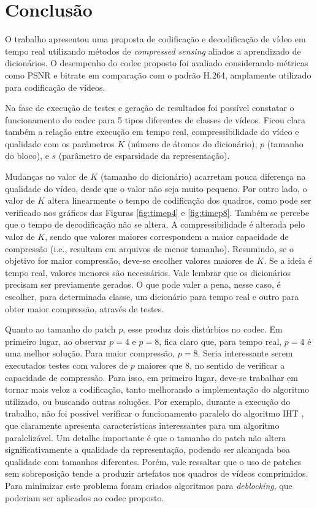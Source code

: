 \documentclass[cic,tc]{iiufrgs}
\begin{document}
\chapter{Conclusão}
O trabalho apresentou uma proposta de codificação e decodificação de vídeo em tempo real
utilizando métodos de \emph{compressed sensing}
aliados a aprendizado de dicionários.
O desempenho do codec proposto foi avaliado considerando métricas como PSNR e bitrate em 
comparação com o padrão H.264,
amplamente utilizado para codificação de vídeos.

Na fase de execução de testes e geração de resultados foi possível constatar o funcionamento 
do codec para 5 tipos diferentes de classes de vídeos.
Ficou clara também a relação entre execução em tempo real, compressibilidade do vídeo e 
qualidade com os parâmetros $K$ (número de átomos do dicionário), $p$ (tamanho do bloco), 
e $s$ (parâmetro de esparsidade da representação).

Mudanças no valor de $K$ (tamanho do dicionário) acarretam pouca diferença na qualidade do vídeo, desde que 
o valor não seja muito pequeno. 
Por outro lado, o valor de $K$ altera linearmente o tempo de codificação dos quadros, como 
pode ser verificado nos gráficos das Figuras \ref{fig:timep4} e \ref{fig:timep8}.
Também se percebe que o tempo de decodificação não se altera.
A compressibilidade é alterada pelo valor de $K$, sendo que valores maiores correspondem 
a maior capacidade de compressão (i.e., resultam em arquivos de menor tamanho).
Resumindo, se o objetivo for maior compressão, deve-se escolher valores maiores de $K$.
Se a ideia é tempo real, valores menores são necessários.
Vale lembrar que os dicionários precisam ser previamente gerados. 
O que pode valer a pena, nesse caso, é escolher, para determinada classe, um dicionário para 
tempo real e outro para obter maior compressão, através de testes.

Quanto ao tamanho do patch $p$, esse produz dois distúrbios no codec.
Em primeiro lugar, ao observar $p=4$ e $p=8$, fica claro que, para tempo real, $p=4$ é uma melhor 
solução. 
Para maior compressão, $p=8$. 
Seria interessante serem executados testes com valores de $p$ maiores que $8$, 
no sentido de verificar a capacidade de compressão.
Para isso, em primeiro lugar, deve-se trabalhar em tornar mais veloz a codificação, tanto 
melhorando a implementação do algoritmo utilizado, ou buscando outras soluções.
Por exemplo, durante a execução do trabalho, não foi possível verificar o funcionamento 
paralelo do algoritmo IHT \cite{BLUMENSATHIHT}, que claramente apresenta características
interessantes para um algoritmo paralelizável.
Um detalhe importante é que o tamanho do patch não altera significativamente a qualidade 
da representação, podendo ser alcançada boa qualidade com tamanhos diferentes. 
Porém, vale ressaltar que o uso de patches sem sobreposição tende a produzir artefatos 
nos quadros de vídeos comprimidos.
Para minimizar este problema foram criados algoritmos para \emph{deblocking}, que poderiam 
ser aplicados ao codec proposto.
\end{document}
